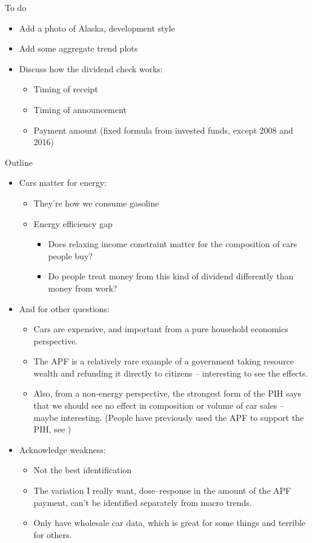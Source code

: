 \documentclass[aspectratio=169]{beamer}
\begin{document}
\begin{frame}{To do}
	\begin{itemize}
		\item Add a photo of Alaska, development style
		\item Add some aggregate trend plots
		\item Discuss how the dividend check works:
		\begin{itemize}
			\item Timing of receipt
			\item Timing of announcement
			\item Payment amount (fixed formula from invested funds, except 2008 and 2016)
		\end{itemize}
	\end{itemize}
\end{frame}
\begin{frame}{Outline}
	\begin{itemize}
		\item Cars matter for energy:
		\begin{itemize}
			\item They're how we consume gasoline
			\item Energy efficiency gap
			\begin{itemize}
				\item Does relaxing income constraint matter for the composition of cars people buy?
				\item Do people treat money from this kind of dividend differently than money from work?
			\end{itemize}
		\end{itemize}
		\item And for other questions:
		\begin{itemize}
			\item Cars are expensive, and important from a pure household economics perspective.
			\item The APF is a relatively rare example of a government taking resource wealth and refunding it directly to citizens -- interesting to see the effects.
			\item Also, from a non-energy perspective, the strongest form of the PIH says that we should see no effect in composition or volume of car sales -- maybe interesting. (People have previously used the APF to support the PIH, see \cite{hsieh2003})
		\end{itemize}

		\item Acknowledge weakness:
		\begin{itemize}
			\item Not the best identification
			\item The variation I really want, dose--response in the amount of the APF payment, can't be identified separately from macro trends.
			\item Only have wholesale car data, which is great for some things and terrible for others.
		\end{itemize}
	\end{itemize}
\end{frame}
\end{document}
